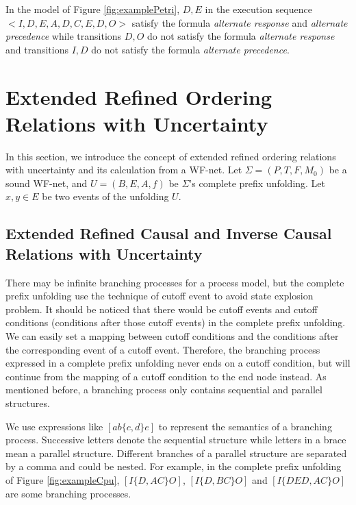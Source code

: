 \documentclass[dvips,...]{llncs}
\begin{document}
\begin{example}\label{ex:relationFormulas}
In the model of Figure \ref{fig:examplePetri}, $D,E$ in the execution sequence $<I,D,E,A,D,C,E,D,O>$ satisfy the formula \textit{alternate response} and \textit{alternate precedence} while transitions $D,O$ do not satisfy the formula \textit{alternate response} and transitions $I,D$ do not satisfy the formula \textit{alternate precedence}.
\end{example}

\section{Extended Refined Ordering Relations with Uncertainty}\label{sec:relations}
In this section, we introduce the concept of extended refined ordering relations with uncertainty and its calculation from a WF-net. Let $\Sigma=(P,T,F,M_{0})$ be a sound WF-net, and $U=(B,E,A,f)$ be $\Sigma$'s complete prefix unfolding. Let $x,y\in E$ be two events of the unfolding $U$.

\subsection{Extended Refined Causal and Inverse Causal Relations with Uncertainty}\label{subsec:causalAndInverseCausal}
There may be infinite branching processes for a process model, but the complete prefix unfolding use the technique of cutoff event to avoid state explosion problem. It should be noticed that there would be cutoff events and cutoff conditions (conditions after those cutoff events) in the complete prefix unfolding. We can easily set a mapping between cutoff conditions and the conditions after the corresponding event of a cutoff event. Therefore, the branching process expressed in a complete prefix unfolding never ends on a cutoff condition, but will continue from the mapping of a cutoff condition to the end node instead. As mentioned before, a branching process only contains sequential and parallel structures.

We use expressions like $[ab\{c,d\}e]$ to represent the semantics of a branching process. Successive letters denote the sequential structure while letters in a brace mean a parallel structure. Different branches of a parallel structure are separated by a comma and could be nested. For example, in the complete prefix unfolding of Figure \ref{fig:exampleCpu}, $[I\{D,AC\}O]$, $[I\{D,BC\}O]$ and $[I\{DED,AC\}O]$ are some branching processes.
\end{document}
